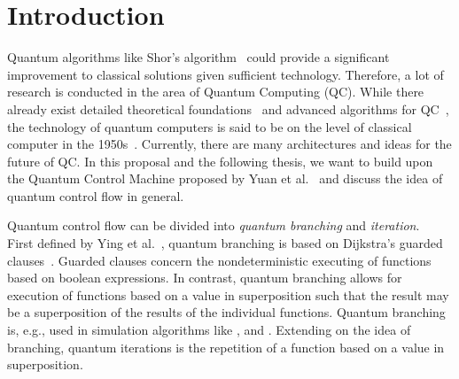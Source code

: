 \chapter{Introduction}
Quantum algorithms like Shor's algorithm~\cite{Shor97} could provide a significant improvement to classical solutions given sufficient technology. Therefore, a lot of research is conducted in the area of Quantum Computing (QC). While there already exist detailed theoretical foundations~\cite{van20, Ying11,YYF12} and advanced algorithms for QC~\cite{ACR*10,BGB*18,LoCh19,Shor97}, the technology of quantum computers is said to be on the level of classical computer in the 1950s~\cite{CFM17}. Currently, there are many architectures and ideas for the future of QC. In this proposal and the following thesis, we want to build upon the Quantum Control Machine proposed by Yuan et al.~\cite{YVC24} and discuss the idea of quantum control flow in general.

Quantum control flow can be divided into \emph{quantum branching} and \emph{iteration}.~\cite{YVC24} First defined by Ying et al.~\cite{YYF12}, quantum branching is based on Dijkstra's guarded clauses~\cite{Dijk75}. Guarded clauses concern the nondeterministic executing of functions based on boolean expressions. In contrast, quantum branching allows for execution of functions based on a value in superposition such that the result may be a superposition of the results of the individual functions. Quantum branching is, e.g., used in simulation algorithms like \cite{BGB*18}, and \cite{LoCh19}. Extending on the idea of branching, quantum iterations is the repetition of a function based on a value in superposition. 

